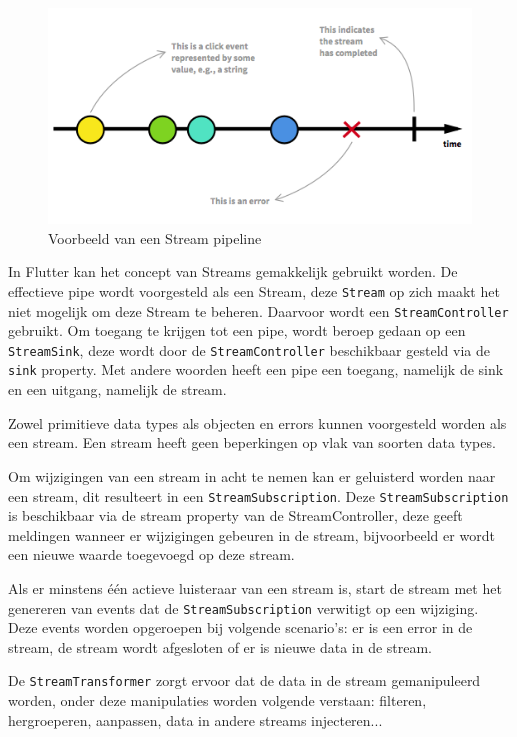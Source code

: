 \begin{figure}[H]
    \centering
    \includegraphics[width=\figureWidthModifier\linewidth]{img/stand-van-zaken/stream-pipeline.png}
    \caption{Voorbeeld van een Stream pipeline}
    \label{fig:stream-pipeline}
\end{figure}

In Flutter kan het concept van Streams gemakkelijk gebruikt worden. De effectieve pipe wordt voorgesteld als een Stream, deze \verb|Stream| op zich maakt het niet mogelijk om deze Stream te beheren.
Daarvoor wordt een \verb|StreamController| gebruikt. Om toegang te krijgen tot een pipe, wordt beroep gedaan op een \verb|StreamSink|, deze wordt door de \verb|StreamController| beschikbaar gesteld via de \verb|sink| property.
Met andere woorden heeft een pipe een toegang, namelijk de sink en een uitgang, namelijk de stream.

Zowel primitieve data types als objecten en errors kunnen voorgesteld worden als een stream. Een stream heeft geen beperkingen op vlak van soorten data types.

Om wijzigingen van een stream in acht te nemen kan er geluisterd worden naar een stream, dit resulteert in een \verb|StreamSubscription|. Deze \verb|StreamSubscription| is beschikbaar via de stream property van de StreamController, deze geeft meldingen wanneer er wijzigingen gebeuren in de stream, bijvoorbeeld er wordt een nieuwe waarde toegevoegd op deze stream.

Als er minstens één actieve luisteraar van een stream is, start de stream met het genereren van events dat de \verb|StreamSubscription| verwitigt op een wijziging. Deze events worden opgeroepen bij volgende scenario's: er is een error in de stream, de stream wordt afgesloten of er is nieuwe data in de stream.

De \verb|StreamTransformer| zorgt ervoor dat de data in de stream gemanipuleerd worden, onder deze manipulaties worden volgende verstaan: filteren, hergroeperen, aanpassen, data in andere streams injecteren...

